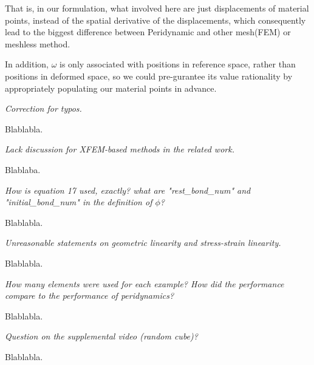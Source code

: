 That is, in our formulation, what involved here are just displacements of material points,
instead of the spatial derivative of the displacements, which consequently lead to the biggest difference between Peridynamic and other mesh(FEM) or meshless method.

In addition, $\omega$ is only associated with positions in reference space, rather than positions in deformed space,
so we could pre-gurantee its value rationality by appropriately populating our material points in advance.

\emph{Correction for typos.}

Blablabla.

\emph{Lack discussion for XFEM-based methods in the related work.}

Blablaba.

\emph{How is equation 17 used, exactly? what are "rest\_bond\_num" and "initial\_bond\_num" in the definition of $\phi$?}

Blablabla.

\emph{Unreasonable statements on geometric linearity and stress-strain linearity.}

Blablabla.

\emph{How many elements were used for each example? How did the performance compare to the performance of peridynamics?}

Blablabla.

\emph{Question on the supplemental video (random cube)?}

Blablabla.


%

%



